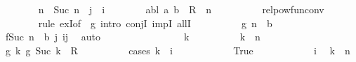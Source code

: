 \begin{isabellebody}
\ \ \ \ \ \ \isamarkupfalse%
\ {\isacharquery}{\kern0pt}n\ {\isacharequal}{\kern0pt}\ {\isachardoublequoteopen}Suc\ {\isacharparenleft}{\kern0pt}n\ {\isacharminus}{\kern0pt}\ {\isacharparenleft}{\kern0pt}j\ {\isacharminus}{\kern0pt}\ i{\isacharparenright}{\kern0pt}{\isacharparenright}{\kern0pt}{\isachardoublequoteclose}\isanewline
\ \ \ \ \ \ \isamarkupfalse%
\ abl{\isacharcolon}{\kern0pt}\ {\isachardoublequoteopen}{\isacharparenleft}{\kern0pt}a{\isacharcomma}{\kern0pt}\ b{\isacharparenright}{\kern0pt}\ {\isasymin}\ R\ {\isacharcircum}{\kern0pt}{\isacharcircum}{\kern0pt}\ {\isacharquery}{\kern0pt}n{\isachardoublequoteclose}\isanewline
\ \ \ \ \ \ \ \ \isamarkupfalse%
\ relpow{\isacharunderscore}{\kern0pt}fun{\isacharunderscore}{\kern0pt}conv\isanewline
\ \ \ \ \ \ \isamarkupfalse%
\ {\isacharparenleft}{\kern0pt}rule\ exI{\isacharbrackleft}{\kern0pt}of\ {\isacharunderscore}{\kern0pt}\ {\isacharquery}{\kern0pt}g{\isacharbrackright}{\kern0pt}{\isacharcomma}{\kern0pt}\ intro\ conjI\ impI\ allI{\isacharparenright}{\kern0pt}\isanewline
\ \ \ \ \ \ \ \ \isamarkupfalse%
\ {\isachardoublequoteopen}{\isacharquery}{\kern0pt}g\ {\isacharquery}{\kern0pt}n\ {\isacharequal}{\kern0pt}\ b{\isachardoublequoteclose}\isanewline
\ \ \ \ \ \ \ \ \ \ \isamarkupfalse%
\ {\isacartoucheopen}f{\isacharparenleft}{\kern0pt}Suc\ n{\isacharparenright}{\kern0pt}\ {\isacharequal}{\kern0pt}\ b{\isacartoucheclose}\ j\ ij\ \isamarkupfalse%
\ auto\isanewline
\ \ \ \ \ \ \isamarkupfalse%
\isanewline
\ \ \ \ \ \ \ \ \isamarkupfalse%
\ k\isanewline
\ \ \ \ \ \ \ \ \isamarkupfalse%
\ {\isachardoublequoteopen}k\ {\isacharless}{\kern0pt}\ {\isacharquery}{\kern0pt}n{\isachardoublequoteclose}\isanewline
\ \ \ \ \ \ \ \ \isamarkupfalse%
\ {\isachardoublequoteopen}{\isacharparenleft}{\kern0pt}{\isacharquery}{\kern0pt}g\ k{\isacharcomma}{\kern0pt}\ {\isacharquery}{\kern0pt}g\ {\isacharparenleft}{\kern0pt}Suc\ k{\isacharparenright}{\kern0pt}{\isacharparenright}{\kern0pt}\ {\isasymin}\ R{\isachardoublequoteclose}\isanewline
\ \ \ \ \ \ \ \ \isamarkupfalse%
\ {\isacharparenleft}{\kern0pt}cases\ {\isachardoublequoteopen}k\ {\isacharless}{\kern0pt}\ i{\isachardoublequoteclose}{\isacharparenright}{\kern0pt}\isanewline
\ \ \ \ \ \ \ \ \ \ \isamarkupfalse%
\ True\isanewline
\ \ \ \ \ \ \ \ \ \ \isamarkupfalse%
\ i\ \isamarkupfalse%
\ {\isachardoublequoteopen}k\ {\isasymle}\ n{\isachardoublequoteclose}\isanewline

\end{isabellebody}
